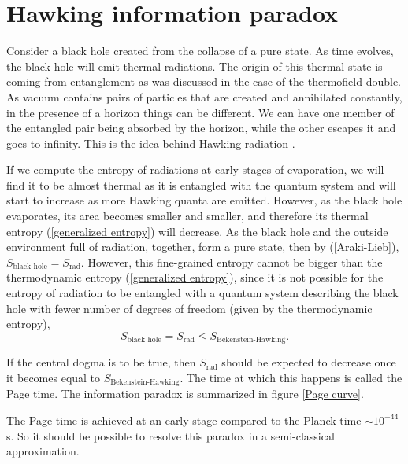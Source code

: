 \section{Hawking information paradox}

Consider a black hole created from the collapse of a pure state. As time evolves, the black hole will emit thermal radiations. The origin of this thermal state is coming from entanglement as was discussed in the case of the thermofield double. As vacuum contains pairs of particles that are created and annihilated constantly, in the presence of a horizon things can be different. We can have one member of the entangled pair being absorbed by the horizon, while the other escapes it  and goes to infinity. This is the idea behind Hawking radiation \cite{Hawking1975}.

If we compute the entropy of radiations at early stages of evaporation, we will find it to be almost thermal as it is entangled with the quantum system and will start to increase as more Hawking quanta are emitted. However, as the black hole evaporates, its area becomes smaller and smaller, and therefore its thermal entropy (\ref{generalized entropy}) will decrease. As the black hole and the outside environment full of radiation, together, form a pure state, then by (\ref{Araki-Lieb}), $S_{\text{black hole}}=S_\text{rad}$. However, this fine-grained entropy cannot be bigger than the thermodynamic entropy (\ref{generalized entropy}), since it is not possible for the entropy of radiation to be entangled with a quantum system describing the black hole with fewer number of degrees of freedom (given by the thermodynamic entropy),
\begin{equation}
    S_{\text{black hole}}=S_\text{rad}\leq S_\text{Bekenstein-Hawking}.
\end{equation}

If the central dogma is to be true, then $S_\text{rad}$ should be expected to decrease once it becomes equal to $S_\text{Bekenstein-Hawking}$. The time at which this happens is called the Page time. The information paradox is summarized in figure \ref{Page curve}.

The Page time is achieved at an early stage compared to the Planck time $\sim 10^{-44}$s. So it should be possible to resolve this paradox in a semi-classical approximation.

